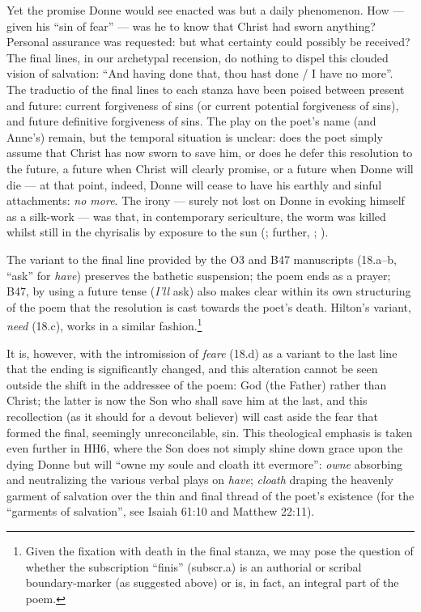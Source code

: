 \begin{paper}
Yet the promise Donne would see enacted was but a daily phenomenon. How
--- given his ``sin of fear'' --- was he to know that Christ had sworn
anything? Personal assurance was requested: but what certainty could
possibly be received? The final lines, in our archetypal recension, do
nothing to dispel this clouded vision of salvation: ``And having done
that, thou hast done / I have no more''. The traductio of the final lines
to each stanza have been poised between present and future: current
forgiveness of sins (or current potential forgiveness of sins), and
future definitive forgiveness of sins. The play on the poet's name (and
Anne's) remain, but the temporal situation is unclear: does the poet
simply assume that Christ has now sworn to save him, or does he defer
this resolution to the future, a future when Christ will clearly
promise, or a future when Donne will die --- at that point, indeed, Donne
will cease to have his earthly and sinful attachments: \emph{no more}.
The irony --- surely not lost on Donne in evoking himself as a silk-work
--- was that, in contemporary sericulture, the worm was killed whilst
still in the chyrisalis by exposure to the sun (\citealt[28]{bonoeil_his_1622};
further, \citealt[159--61]{staples_clothing_2013}; \citealt{hatch_virginia_1957}).

The variant to the final line provided by the O3 and B47 manuscripts
(18.a--b, ``ask'' for \emph{have}) preserves the bathetic suspension;
the poem ends as a prayer; B47, by using a future tense (\emph{I'll}
ask) also makes clear within its own structuring of the poem that the
resolution is cast towards the poet's death. Hilton's variant,
\emph{need} (18.c), works in a similar fashion.\footnote{Given the
  fixation with death in the final stanza, we may pose the question of
  whether the subscription ``finis'' (subscr.a) is an authorial or
  scribal boundary-marker (as suggested above) or is, in fact, an
  integral part of the poem.}

It is, however, with the intromission of \emph{feare} (18.d) as a
variant to the last line that the ending is significantly changed, and
this alteration cannot be seen outside the shift in the addressee of the
poem: God (the Father) rather than Christ; the latter is now the Son who
shall save him at the last, and this recollection (as it should for a
devout believer) will cast aside the fear that formed the final,
seemingly unreconcilable, sin. This theological emphasis is taken even
further in HH6, where the Son does not simply shine down grace upon the
dying Donne but will ``owne my soule and cloath itt evermore'':
\emph{owne} absorbing and neutralizing the various verbal plays on
\emph{have}; \emph{cloath} draping the heavenly garment of salvation
over the thin and final thread of the poet's existence (for the
``garments of salvation'', see Isaiah 61:10 and Matthew 22:11).


\end{paper}
